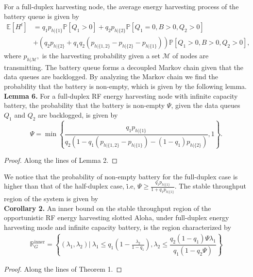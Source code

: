\documentclass[draftcls,12pt,onecolumn]{IEEEtran}
\begin{document}
\indent For a full-duplex harvesting node, the average energy harvesting process of the battery queue is given by 
\begin{align}
\mathbb{E}[H^{t}] &= q_1 p_{h|\lbrace 1\rbrace} \mathbb{P}[Q_1>0] +  q_2 p_{h|\lbrace 2 \rbrace} \mathbb{P}[Q_1=0, B>0, Q_2>0]  \\ &+ (q_2 p_{h|\lbrace 2\rbrace} +q_1 q_2 (p_{h|\lbrace 1,2 \rbrace}-p_{h|\lbrace 2 \rbrace}-p_{h|\lbrace 1 \rbrace}) ) \mathbb{P}[Q_1>0, B>0, Q_2 >0] \nonumber, 
\end{align}
where $p_{h|\mathcal{M}}, $ is the harvesting probability given a set $\mathcal{M} $ of nodes are transmitting. The battery queue forms a decoupled Markov chain given that the data queues are backlogged. By analyzing the Markov chain we find the probability that the battery is non-empty, which is given by the following lemma.\\
\indent \textbf{Lemma 6.} For a full-duplex RF energy harvesting node with infinite capacity battery, the probability that the battery is non-empty $\Psi$, given the data queues $Q_1$ and $Q_2$ are backlogged, is given by 
\begin{equation}
\Psi= \min \left\lbrace \frac{q_1 p_{h|\lbrace 1\rbrace}}{q_2 (1-q_1 (p_{h|\lbrace 1,2 \rbrace}-p_{h|\lbrace 1\rbrace})-(1-q_1)p_{h|\lbrace 2 \rbrace} )}, 1\right\rbrace. 
\end{equation} 
\begin{proof}
Along the lines of Lemma 2.
\end{proof}
\indent We notice that the probability of non-empty battery for the full-duplex case is higher than that of the half-duplex case, \.i.e, $\Psi \geq \frac{q_1 p_{h|\lbrace 1\rbrace}}{ 1+ q_1 p_{h|\lbrace 1\rbrace}}.$ The stable throughput region of the system is given by\\
\indent \textbf{Corollary 2.} An inner bound on the stable throughput region of the opportunistic RF energy harvesting slotted Aloha, under full-duplex energy harvesting mode and infinite capacity battery, is the region characterized by  
\begin{align} \label{eqn thm3}
\mathbb{R}_G^{\text{inner}}= \left\lbrace  (\lambda_1, \lambda_2) | \ \lambda_1 \leq  q_1 \left( 1- \frac{\lambda_2}{1-q_1}\right),  \lambda_2 \leq  \dfrac{q_2 (1-q_1) \Psi \lambda_1}{q_1 \left( 1- q_2 \Psi \right)} \right\rbrace 
\end{align}
\begin{proof}
Along the lines of Theorem 1.
\end{proof}
\end{document}
